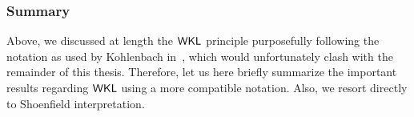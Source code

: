 \subsubsection*{Summary}
Above, we discussed at length the $\textsf{\upshape WKL}$ principle purposefully following the notation
as used by Kohlenbach in~\cite{Kohlenbach08}, which would unfortunately 
clash with the remainder of this thesis. Therefore, let us here briefly summarize the important
results regarding $\textsf{\upshape WKL}$ using a more compatible notation. Also, we resort directly to Shoenfield
interpretation.

